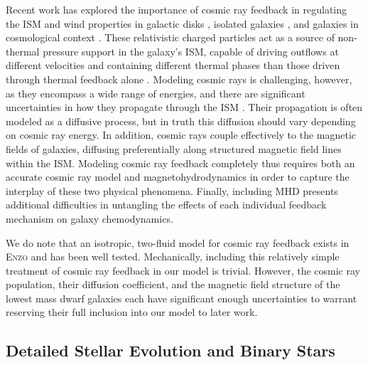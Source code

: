 \documentclass[fleqn,usenatbib,useAMS]{mnras}
\begin{document}
Recent work has explored the importance of cosmic ray feedback in regulating the ISM and wind properties in galactic disks \citep{Hanasz2013,GirichidisCR,Simpson2016,Farber2017}, isolated galaxies \citep{SalemBryanCorlies,Salem2015,Pakmor2016,Ruszkowski2017}, and galaxies in cosmological context \citep{SalemBryanHummels}. These relativistic charged particles act as a source of non-thermal pressure support in the galaxy's ISM, capable of driving outflows at different velocities and containing different thermal phases than those driven through thermal feedback alone \citep{SalemBryanCorlies}. Modeling cosmic rays is challenging, however, as they encompass a wide range of energies, and there are significant uncertainties in how they propagate through the ISM \citep[e.g.][]{Wiener2017}. Their propagation is often modeled as a diffusive process, but in truth this diffusion should vary depending on cosmic ray energy. In addition, cosmic rays couple effectively to the magnetic fields of galaxies, diffusing preferentially along structured magnetic field lines within the ISM. Modeling cosmic ray feedback completely thus requires both an accurate cosmic ray model and magnetohydrodynamics in order to capture the interplay of these two physical phenomena. Finally, including MHD presents additional difficulties in untangling the effects of each individual feedback mechanism on galaxy chemodynamics.

We do note that an isotropic, two-fluid model for cosmic ray feedback exists in  \textsc{Enzo} \citep{SalemBryan2014,Salem2015} and has been well tested. Mechanically, including this relatively simple treatment of 
cosmic ray feedback in our model is trivial. However, the cosmic ray population, their diffusion coefficient, and the magnetic field structure of the lowest mass dwarf galaxies each have significant enough uncertainties to warrant reserving their full inclusion into our model to later work.

\subsection{Detailed Stellar Evolution and Binary Stars}
\label{sec:binary stars} 
\end{document}
